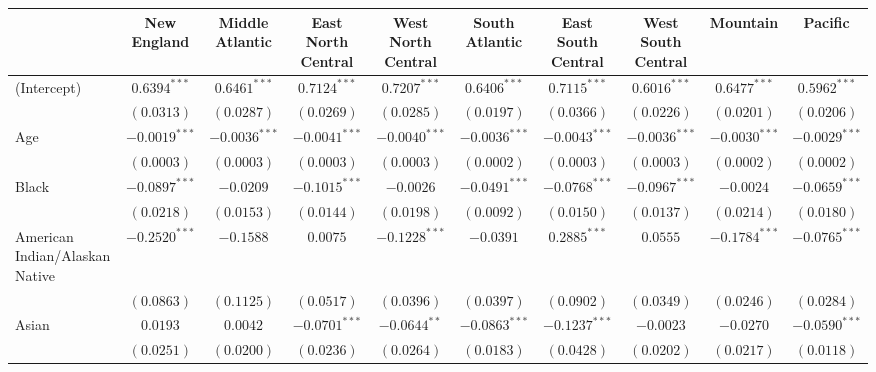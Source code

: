 \documentclass{article}
\begin{document}
\begin{table}
\centering
\begin{adjustbox}{width=1\textwidth}
\begin{tabular}{l c c c c c c c c c}
\hline
 & New England & Middle Atlantic & East North Central & West North Central & South Atlantic & East South Central & West South Central & Mountain & Pacific \\
\hline
(Intercept)                    & $0.6394^{***}$  & $0.6461^{***}$  & $0.7124^{***}$  & $0.7207^{***}$  & $0.6406^{***}$  & $0.7115^{***}$  & $0.6016^{***}$  & $0.6477^{***}$  & $0.5962^{***}$  \\
                               & $(0.0313)$      & $(0.0287)$      & $(0.0269)$      & $(0.0285)$      & $(0.0197)$      & $(0.0366)$      & $(0.0226)$      & $(0.0201)$      & $(0.0206)$      \\
Age                            & $-0.0019^{***}$ & $-0.0036^{***}$ & $-0.0041^{***}$ & $-0.0040^{***}$ & $-0.0036^{***}$ & $-0.0043^{***}$ & $-0.0036^{***}$ & $-0.0030^{***}$ & $-0.0029^{***}$ \\
                               & $(0.0003)$      & $(0.0003)$      & $(0.0003)$      & $(0.0003)$      & $(0.0002)$      & $(0.0003)$      & $(0.0003)$      & $(0.0002)$      & $(0.0002)$      \\
Black                          & $-0.0897^{***}$ & $-0.0209$       & $-0.1015^{***}$ & $-0.0026$       & $-0.0491^{***}$ & $-0.0768^{***}$ & $-0.0967^{***}$ & $-0.0024$       & $-0.0659^{***}$ \\
                               & $(0.0218)$      & $(0.0153)$      & $(0.0144)$      & $(0.0198)$      & $(0.0092)$      & $(0.0150)$      & $(0.0137)$      & $(0.0214)$      & $(0.0180)$      \\
American Indian/Alaskan Native & $-0.2520^{***}$ & $-0.1588$       & $0.0075$        & $-0.1228^{***}$ & $-0.0391$       & $0.2885^{***}$  & $0.0555$        & $-0.1784^{***}$ & $-0.0765^{***}$ \\
                               & $(0.0863)$      & $(0.1125)$      & $(0.0517)$      & $(0.0396)$      & $(0.0397)$      & $(0.0902)$      & $(0.0349)$      & $(0.0246)$      & $(0.0284)$      \\
Asian                          & $0.0193$        & $0.0042$        & $-0.0701^{***}$ & $-0.0644^{**}$  & $-0.0863^{***}$ & $-0.1237^{***}$ & $-0.0023$       & $-0.0270$       & $-0.0590^{***}$ \\
                               & $(0.0251)$      & $(0.0200)$      & $(0.0236)$      & $(0.0264)$      & $(0.0183)$      & $(0.0428)$      & $(0.0202)$      & $(0.0217)$      & $(0.0118)$      \\

\end{tabular}
\end{adjustbox}
\end{table}
\end{document}
